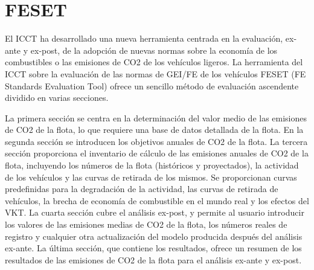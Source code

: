 \section{FESET}

El ICCT ha desarrollado una nueva herramienta centrada en la evaluación, ex-ante y ex-post, de la adopción de nuevas normas sobre la economía de los combustibles o las emisiones de CO2 de los vehículos ligeros. La herramienta del ICCT sobre la evaluación de las normas de GEI/FE de los vehículos FESET (FE Standards Evaluation Tool) ofrece un sencillo método de evaluación ascendente dividido en varias secciones.

La primera sección se centra en la determinación del valor medio de las emisiones de CO2 de la flota, lo que requiere una base de datos detallada de la flota. En la segunda sección se introducen los objetivos anuales de CO2 de la flota. La tercera sección proporciona el inventario de cálculo de las emisiones anuales de CO2 de la flota, incluyendo los números de la flota (históricos y proyectados), la actividad de los vehículos y las curvas de retirada de los mismos. Se proporcionan curvas predefinidas para la degradación de la actividad, las curvas de retirada de vehículos, la brecha de economía de combustible en el mundo real y los efectos del VKT. La cuarta sección cubre el análisis ex-post, y permite al usuario introducir los valores de las emisiones medias de CO2 de la flota, los números reales de registro y cualquier otra actualización del modelo producida después del análisis ex-ante. La última sección, que contiene los resultados, ofrece un resumen de los resultados de las emisiones de CO2 de la flota para el análisis ex-ante y ex-post. \cite{FESET_ICCT}
